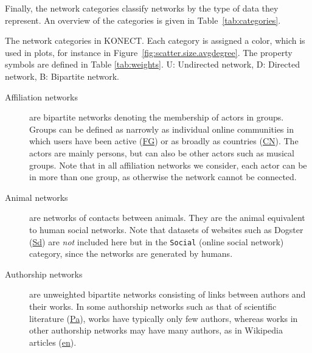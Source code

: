 \documentclass{article}
\begin{document}
Finally, the network categories classify networks by the type of data they
represent.  
An overview of the categories is given in Table~\ref{tab:categories}. 

\begin{table}
  \caption{
    The network categories in KONECT.  
    Each category is assigned a color, which is used in plots, for
    instance in Figure~\ref{fig:scatter.size.avgdegree}. The property
    symbols are defined in Table \ref{tab:weights}.  U: Undirected
    network, D: Directed network, B: Bipartite network. 
    \label{tab:categories}
  }
  \centering
\makebox[\textwidth]{
  
}
\end{table}

\begin{description}
\item[Affiliation networks] are bipartite networks denoting the
  membership of actors in groups.  Groups can be defined as narrowly as
  individual online communities in which users have been active
  (\href{http://konect.uni-koblenz.de/networks/flickr-groupmemberships}{\textsf{FG}})
  or as broadly as countries
  (\href{http://konect.uni-koblenz.de/networks/dbpedia-country}{\textsf{CN}}). The
  actors are mainly persons, but can also be other actors such as musical
  groups. Note that in all affiliation networks we consider, each actor
  can be in more than one group, as otherwise the network cannot be
  connected.

\item[Animal networks] are networks of contacts between animals.  
  They are the animal equivalent to human social networks.  Note that
  datasets of websites such as Dogster
  (\href{http://konect.uni-koblenz.de/networks/petster-friendships-dog}{\textsf{Sd}})
  are \emph{not} included here but in the \texttt{Social} (online social
  network) category, since the networks are generated by humans. 

\item[Authorship networks] are unweighted bipartite networks consisting
  of links between authors and their works.  In some authorship networks
  such as that of scientific literature
  (\href{http://konect.uni-koblenz.de/networks/dblp-author}{\textsf{Pa}}),
  works have typically only few authors, whereas works in other
  authorship networks may have many authors, as in Wikipedia articles
    (\href{http://konect.uni-koblenz.de/networks/edit-enwiki}{\textsf{en}}).


\end{description}
\end{document}
